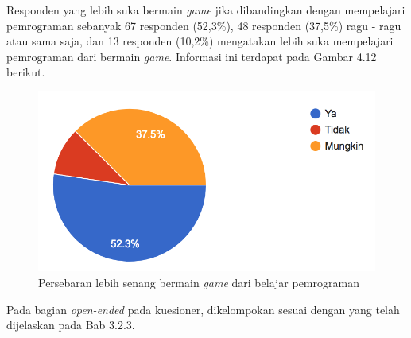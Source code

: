 	Responden yang lebih suka bermain \textit{game} jika dibandingkan dengan mempelajari pemrograman sebanyak 67 responden (52,3\%), 48 responden (37,5\%) ragu - ragu atau sama saja, dan 13 responden (10,2\%) mengatakan lebih suka mempelajari pemrograman dari bermain \textit{game}. Informasi ini terdapat pada Gambar 4.12 berikut.
	\begin{figure}
		\includegraphics[width=\linewidth]{pics/lebih-senang-bermain-game}
		\caption{Persebaran lebih senang bermain \textit{game} dari belajar pemrograman}
		\centering
	\end{figure}
%
Pada bagian \textit{open-ended} pada kuesioner, dikelompokan sesuai dengan yang telah dijelaskan pada Bab 3.2.3.
